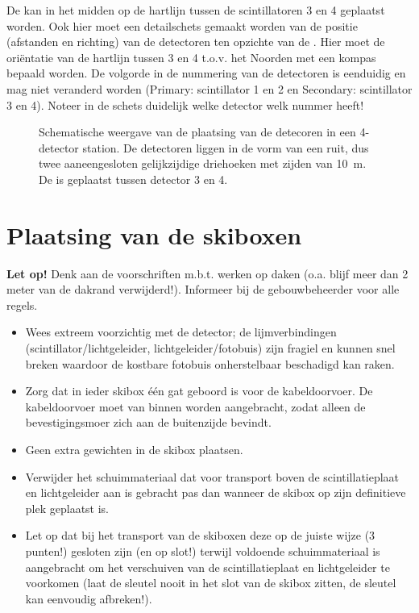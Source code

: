 De \gps kan in het midden op de hartlijn tussen de scintillatoren 3 en 4
geplaatst worden. Ook hier moet een detailschets gemaakt worden van de
positie (afstanden en richting) van de detectoren ten opzichte van de
\gps. Hier moet de oriëntatie van de hartlijn tussen 3 en 4 t.o.v.
het Noorden met een kompas bepaald worden. De volgorde in de nummering
van de detectoren is eenduidig en mag niet veranderd worden (Primary:
scintillator 1 en 2 en Secondary: scintillator 3 en 4). Noteer in de schets
duidelijk welke detector welk nummer heeft!

\begin{figure}
    \centering
    
    \caption{Schematische weergave van de plaatsing van de detecoren in een
             4-detector station. De detectoren liggen in de vorm van een
             ruit, dus twee aaneengesloten gelijkzijdige driehoeken met
             zijden van \SI{10}{\meter}. De \gps is geplaatst tussen
             detector 3 en 4.}
    \label{fig:station-4-layout}
\end{figure}


\section{Plaatsing van de skiboxen}

\textbf{Let op!} Denk aan de voorschriften m.b.t. werken op daken (o.a.
blijf meer dan 2 meter van de dakrand verwijderd!). Informeer bij de
gebouwbeheerder voor alle regels.

\begin{itemize}
    \item Wees extreem voorzichtig met de detector; de lijmverbindingen
    (scintillator/lichtgeleider, lichtgeleider/fotobuis) zijn fragiel
    en kunnen snel breken waardoor de kostbare fotobuis onherstelbaar
    beschadigd kan raken.
    \item Zorg dat in ieder skibox één gat geboord is voor de
    kabeldoorvoer. De kabeldoorvoer moet van binnen worden aangebracht,
    zodat alleen de bevestigingsmoer zich aan de buitenzijde bevindt.
    \item Geen extra gewichten in de skibox plaatsen.
    \item Verwijder het schuimmateriaal dat voor transport
    boven de scintillatieplaat en lichtgeleider aan is gebracht pas
    dan wanneer de skibox op zijn definitieve plek geplaatst is.
    \item Let op dat bij het transport van de skiboxen deze op de juiste
    wijze (3 punten!) gesloten zijn (en op slot!) terwijl voldoende
    schuimmateriaal is aangebracht om het verschuiven van de
    scintillatieplaat en lichtgeleider te voorkomen (laat de sleutel
    nooit in het slot van de skibox zitten, de sleutel kan eenvoudig
    afbreken!).
\end{itemize}

